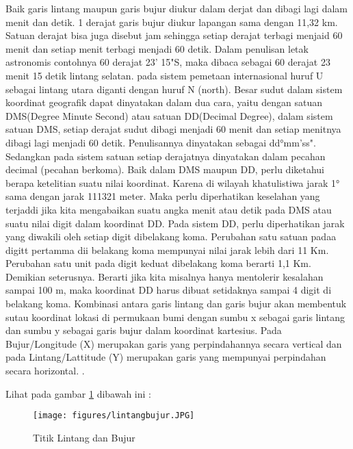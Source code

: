 Baik garis lintang maupun garis bujur diukur dalam derjat dan dibagi lagi dalam menit dan detik. 1 derajat garis bujur diukur lapangan sama dengan 11,32 km. Satuan derajat bisa juga disebut jam sehingga setiap derajat terbagi menjaid 60 menit dan setiap menit terbagi menjadi 60 detik. Dalam penulisan letak astronomis contohnya 60 derajat 23' 15"S, maka dibaca sebagai 60 derajat 23 menit 15 detik lintang selatan. pada sistem pemetaan internasional huruf U sebagai lintang utara diganti dengan huruf N (north). Besar sudut dalam sistem koordinat geografik dapat dinyatakan dalam dua cara, yaitu dengan satuan DMS(Degree Minute Second) atau satuan DD(Decimal Degree), dalam sistem satuan DMS, setiap derajat sudut dibagi menjadi 60 menit dan setiap menitnya dibagi lagi menjadi 60 detik. Penulisannya dinyatakan sebagai dd°mm'ss". Sedangkan pada sistem satuan setiap derajatnya dinyatakan dalam pecahan decimal (pecahan berkoma). Baik dalam DMS maupun DD, perlu diketahui berapa ketelitian suatu nilai koordinat. Karena di wilayah khatulistiwa jarak 1° sama dengan jarak 111321 meter. Maka perlu diperhatikan keselahan yang terjaddi jika kita mengabaikan suatu angka menit atau detik pada DMS atau suatu nilai digit dalam koordinat DD. Pada sistem DD, perlu diperhatikan jarak yang diwakili oleh setiap digit dibelakang koma. Perubahan satu satuan padaa digitt pertamma dii belakang koma mempunyai nilai jarak lebih dari 11 Km. Perubahan satu unit pada digit keduat dibelakang koma berarti 1,1 Km. Demikian seterusnya. Berarti jika kita misalnya hanya mentolerir kesalahan sampai 100 m, maka koordinat DD harus dibuat setidaknya sampai 4 digit di belakang koma. Kombinasi antara garis lintang dan garis bujur akan membentuk sutau koordinat lokasi di permukaan bumi dengan sumbu x sebagai garis lintang dan sumbu y sebagai garis bujur dalam koordinat kartesius. Pada Bujur/Longitude (X) merupakan garis yang perpindahannya secara vertical dan pada Lintang/Lattitude (Y) merupakan garis yang mempunyai perpindahan secara horizontal. \cite{zuhdi2012sistem}.

Lihat pada gambar \ref{lintangbujur} dibawah ini :
\begin{figure}[ht]
	\centerline{\texttt{[image: figures/lintangbujur.JPG]}}
	\caption{Titik Lintang dan Bujur}
	\label{lintangbujur}
	\end{figure}

